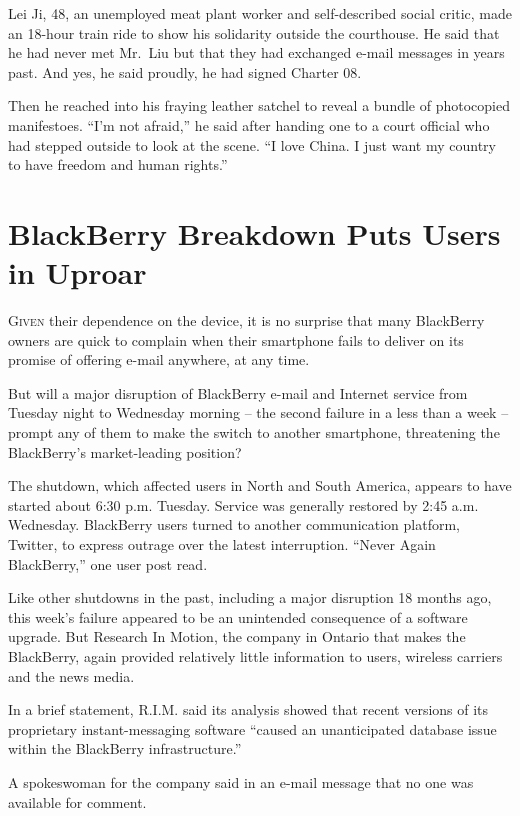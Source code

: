 ﻿\documentclass[12pt]{article}
\begin{document}
Lei Ji, 48, an unemployed meat plant worker and self-described social critic, made an 18-hour train
ride to show his solidarity outside the courthouse. He said that he had never met Mr.~Liu but that
they had exchanged e-mail messages in years past. And yes, he said proudly, he had signed Charter
08.

Then he reached into his fraying leather satchel to reveal a bundle of photocopied manifestoes.
``I'm not afraid,'' he said after handing one to a court official who had stepped outside to look at
the scene. ``I love China. I just want my country to have freedom and human rights.''

\section{BlackBerry Breakdown Puts Users in Uproar}

\lettrine{G}{iven} their dependence on the device, it is no surprise that
many BlackBerry owners are quick to complain when their smartphone fails to deliver on its promise
of offering e-mail anywhere, at any time.

But will a major disruption of BlackBerry e-mail and Internet service from Tuesday night to
Wednesday morning -- the second failure in a less than a week -- prompt any of them to make the
switch to another smartphone, threatening the BlackBerry's market-leading position?

The shutdown, which affected users in North and South America, appears to have started about 6:30
p.m. Tuesday. Service was generally restored by 2:45 a.m. Wednesday. BlackBerry users turned to
another communication platform, Twitter, to express outrage over the latest interruption. ``Never
Again BlackBerry,'' one user post read.

Like other shutdowns in the past, including a major disruption 18 months ago, this week's failure
appeared to be an unintended consequence of a software upgrade. But Research In Motion, the company
in Ontario that makes the BlackBerry, again provided relatively little information to users,
wireless carriers and the news media.

In a brief statement, R.I.M. said its analysis showed that recent versions of its proprietary
instant-messaging software ``caused an unanticipated database issue within the BlackBerry
infrastructure.''

A spokeswoman for the company said in an e-mail message that no one was available for comment.
\end{document}
